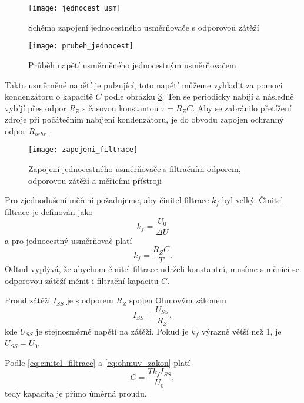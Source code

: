 \documentclass[0-protokol.tex]{subfiles}
\begin{document}
\begin{figure}[H]
\centering
\texttt{[image: jednocest\_usm]}
\caption{Schéma zapojení jednocestného usměrňovače s odporovou zátěží \cite{stud_text}}
\label{fig:jednocest_usm}
\end{figure}

\begin{figure}[H]
\centering
\texttt{[image: prubeh\_jednocest]}
\caption{Průběh napětí usměrněného jednocestným usměrňovačem \cite{stud_text}}
\label{fig:prubeh_jednocest}
\end{figure}

Takto usměrněné napětí je pulzující, toto napětí můžeme vyhladit za pomoci kondenzátoru o kapacitě $C$ podle obrázku \ref{fig:zapojeni_filtrace}. Ten se periodicky nabíjí a následně vybíjí přes odpor $R_Z$ s časovou konstantou $\tau = R_Z C$. Aby se zabránilo přetížení zdroje při počátečním nabíjení kondenzátoru, je do obvodu zapojen ochranný odpor $R_{ochr.}$.

\begin{figure}[H]
\centering
\texttt{[image: zapojeni\_filtrace]}
\caption{Zapojení jednocestného usměrňovače s filtračním odporem, odporovou zátěží a měřicími přístroji \cite{stud_text}}
\label{fig:zapojeni_filtrace}
\end{figure}

Pro zjednodušení měření požadujeme, aby činitel filtrace $k_f$ byl velký. Činitel filtrace je definován jako
\begin{equation}
k_f = \frac{U_0}{\Delta U}
\end{equation}
a pro jednocestný usměrňovač platí
\begin{equation} \label{eq:cinitel_filtrace}
k_f = \frac{R_Z C}{T}.
\end{equation}
Odtud vyplývá, že abychom činitel filtrace udrželi konstantní, musíme s měnící se odporovou zátěží měnit i filtrační kapacitu $C$.

Proud zátěží $I_{SS}$ je s odporem $R_Z$ spojen Ohmovým zákonem
\begin{equation} \label{eq:ohmuv_zakon}
I_{SS} = \frac{U_{SS}}{R_Z},
\end{equation}
kde $U_{SS}$ je stejnosměrné napětí na zátěži. Pokud je $k_f$ výrazně větší než 1, je $U_{SS} = U_0$.

Podle \eqref{eq:cinitel_filtrace} a \eqref{eq:ohmuv_zakon} platí
\begin{equation}
C = \frac{T k_f I_{SS}}{U_0},
\end{equation}
tedy kapacita je přímo úměrná proudu.
\end{document}
